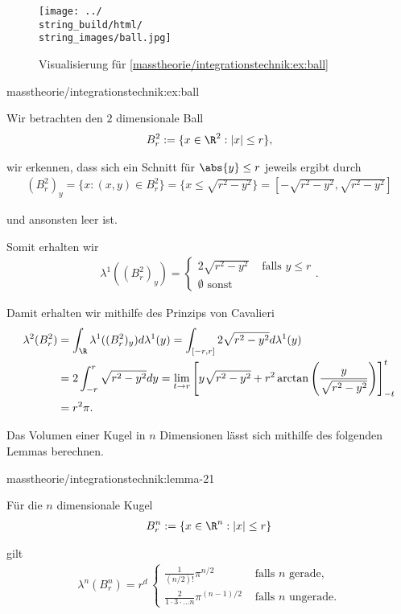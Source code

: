 \documentclass[letterpaper,10pt,german]{jupyterBook}
\begin{document}
\begin{figure}[htbp]
\centering


\noindent\texttt{[image: ../\\string\_build/html/\\string\_images/ball.jpg]}
\caption{Visualisierung für \cref{masstheorie/integrationstechnik:ex:ball} }\label{\detokenize{masstheorie/integrationstechnik:fig-ball}}\end{figure}
\begin{example}{}{masstheorie/integrationstechnik:ex:ball}



\par
Wir betrachten den \(2\) dimensionale Ball
\begin{align*}
B_r^2:=\{x\in\R^2: |x|\leq r\},
\end{align*}
\par
wir erkennen, dass sich ein Schnitt für \(\abs{y}\leq r\) jeweils ergibt durch
\begin{align*}
(B_r^2)_y = \{x:(x,y)\in B_r^2\} = \{x\leq\sqrt{r^2-y^2}\} = [-\sqrt{r^2-y^2},\sqrt{r^2-y^2}]
\end{align*}
\par
und ansonsten leer ist.

\par
Somit erhalten wir
\begin{align*}
\lambda^1((B_r^2)_y) = 
\begin{cases}
2 \sqrt{r^2-y^2}&\text{ falls }y\leq r\\
\emptyset\text{ sonst}
\end{cases}.
\end{align*}
\par
Damit erhalten wir mithilfe des Prinzips von Cavalieri
\begin{align*}
\lambda^2(B_r^2) &= \int_{\R} \lambda^1((B_r^2)_y) d\lambda^1(y) = 
\int_{[-r,r]} 2 \sqrt{r^2-y^2} d\lambda^1(y)\\
&= 
2\int_{-r}^r \sqrt{r^2 - y^2} dy = 
\lim_{t\to r}\left[y \sqrt{r^2-y^2} +r^2\arctan\left(\frac{y}{\sqrt{r^2-y^2}}\right)\right]^t_{-t}\\
&=
r^2\pi.
\end{align*}\end{example}

\par
Das Volumen einer Kugel in \(n\) Dimensionen lässt sich mithilfe des folgenden Lemmas berechnen.
\begin{lemma}{}{masstheorie/integrationstechnik:lemma-21}



\par
Für die \(n\) dimensionale Kugel
\begin{align*}
B_r^n:=\{x\in\R^n: |x|\leq r\}
\end{align*}
\par
gilt
\begin{align*}
\lambda^n(B_r^n) =
r^d\,
\begin{cases}
\frac{1}{(n/2)!} \pi^{n/2}&\text{ falls }n \text{ gerade,}\\
\frac{2}{1\cdot 3\cdot\ldots n} \pi^{(n-1)/2}&\text{ falls }n \text{ ungerade.}
\end{cases}
\end{align*}\end{lemma}
\end{document}
